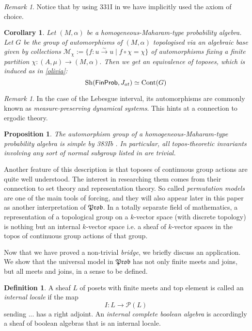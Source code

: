 \documentclass[a4paper]{amsproc}
\theoremstyle{plain}
\newtheorem{proposition}[theorem]{Proposition}
\newtheorem{corollary}[theorem]{Corollary}
\theoremstyle{definition}
\newtheorem{definition}[theorem]{Definition}
\theoremstyle{remark}
\newtheorem{remark}[theorem]{Remark}
\numberwithin{equation}{section}
\DeclareMathOperator{\Sh}{Sh}
\newcommand{\FinProb}{\textup{\textsf{FinProb}}}
\newcommand{\Prob}{\mathfrak{Prob}}
\begin{document}
\begin{remark}
Notice that by using 331I in \cite{fremlin} we have implicitly used the axiom of choice.
\end{remark}

\begin{corollary}\label{Galois} Let $(M, \alpha)$ be a homogeneous-Maharam-type probability algebra. Let $G$ be the group of automorphisms of $(M, \alpha)$ topologised via an algebraic base given by collections $\mathcal{M}_{\chi}:=\{f:u\overset{\sim}{\rightarrow} u\mid f\circ \chi=\chi\} $ of automorphisms fixing a finite partition $\chi: (A,\mu)\rightarrow (M, \alpha)$. Then we get an equivalence of toposes, which is induced as in \ref{olivia}:
\[\Sh(\FinProb, J_{at})\simeq \text{Cont}(G)\]
\end{corollary}
\begin{remark} In the case of the Lebesgue interval, its automorphisms are commonly known as \emph{measure-preserving dynamical systems}. This hints at a connection to ergodic theory.
\end{remark}
\begin{proposition} The automorphism group of a homogeneous-Maharam-type probability algebra is simple by 383Ib \cite{fremlin}. In particular, all topos-theoretic invariants involving any sort of normal subgroup listed in \cite{caramello_lafforgue} are trivial.
\end{proposition}

Another feature of this description is that toposes of continuous group actions are quite well understood. The interest in researching them comes from their connection to set theory and representation theory. So called \emph{permutation models} are one of the main tools of forcing, and they will also appear later in this paper as another interpretation of $\Prob$. In a totally separate field of mathematics, a representation of a topological group on a $k$-vector space (with discrete topology) is nothing but an internal $k$-vector space \cite{XYZ} i.e. a sheaf of $k$-vector spaces in the topos of continuous group actions of that group.

Now that we have proved a non-trivial \emph{bridge}, we briefly discuss an application. We show that the universal model in $\Prob$ has not only finite meets and joins, but all meets and joins, in a sense to be defined.

\begin{definition} A sheaf $L$ of posets with finite meets and top element is called an \emph{internal locale} if the map
\[I: L\rightarrow \mathcal{P}(L) \]
sending ... has a right adjoint. An \emph{internal complete boolean algebra} is accordingly a sheaf of boolean algebras that is an internal locale.
\end{definition}
\end{document}
